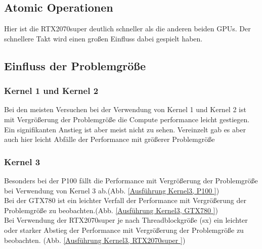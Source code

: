 \documentclass[10pt,a4paper]{article}
\begin{document}
	  \subsection{Atomic Operationen}
	  Hier ist die RTX2070super deutlich schneller als die anderen beiden GPUs. Der schnellere Takt wird einen großen Einfluss dabei gespielt haben.
	  \subsection{Einfluss der Problemgröße}
	  \subsubsection{Kernel 1 und Kernel 2}
	  Bei den meisten Versuchen bei der Verwendung von Kernel 1 und Kernel 2 ist mit Vergrößerung der Problemgröße die Compute performance leicht gestiegen. Ein signifikanten Anstieg ist aber meist nicht zu sehen. Vereinzelt gab es aber auch hier leicht Abfälle der Performance mit größerer Problemgröße
	  \subsubsection{Kernel 3}
	  Besonders bei der P100 fällt die Performance mit Vergrößerung der Problemgröße bei Verwendung von Kernel 3 ab.(Abb. \ref{Ausführung Kernel3, P100 })\\ Bei der GTX780 ist ein leichter Verfall der Performance mit Vergrößerung der Problemgröße zu beobachten.(Abb. \ref{Ausführung Kernel3, GTX780 })\\
	  Bei Verwendung der RTX2070super je nach Threadblockgröße (sx) ein leichter oder starker Abstieg der Performance mit Vergrößerung der Problemgröße zu beobachten. (Abb. \ref{Ausführung Kernel3, RTX2070super })
\end{document}

